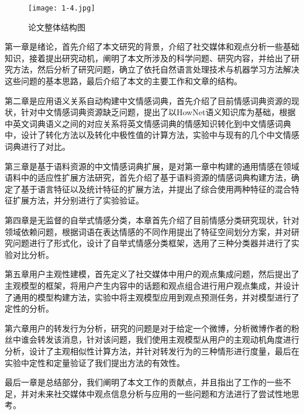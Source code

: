 \begin{figure}[htp]
\centering
\texttt{[image: 1-4.jpg]}
\caption{论文整体结构图}
\label{fig1-4}
\end{figure}

第一章是绪论，首先介绍了本文研究的背景，介绍了社交媒体和观点分析一些基础知识，接着提出研究动机，阐明了本文所涉及的科学问题、研究内容，并给出了研究方法，然后分析了研究问题，确立了依托自然语言处理技术与机器学习方法解决这些问题的基本思路，最后介绍了本文的主要工作和文章的结构。

第二章是应用语义关系自动构建中文情感词典，首先介绍了目前情感词典资源的现状，针对中文情感词典资源缺乏问题，提出了以HowNet语义知识库为基础，根据中英文词典语义之间的对应关系将英文情感词典的情感知识转化到中文情感词典中，设计了转化方法以及转化中极性值的计算方法，实验中与现有的几个中文情感词典进行了对比。

第三章是基于语料资源的中文情感词典扩展，是对第一章中构建的通用情感在领域语料中的适应性扩展方法研究，首先介绍了基于语料资源的情感词典构建方法，确定了基于语言特征以及统计特征的扩展方法，并提出了综合使用两种特征的混合特征扩展方法，并分别进行了实验验证。

第四章是无监督的自举式情感分类，本章首先介绍了目前情感分类研究现状，针对领域依赖问题，根据词语在表达情感的不同作用提出了特征空间划分方案，并对研究问题进行了形式化，设计了自举式情感分类框架，选用了三种分类器并进行了实验对比分析。

第五章用户主观性建模，首先定义了社交媒体中用户的观点集成问题，然后提出了主观模型的框架，将用户产生内容中的话题和观点组合进行用户观点集成，并设计了通用的模型构建方法，实验中将主观模型应用到观点预测任务，并对模型进行了定性的分析。

第六章用户的转发行为分析，研究的问题是对于给定一个微博，分析微博作者的粉丝中谁会转发该消息，针对该问题，我们使用主观模型从用户的主观动机角度进行分析，设计了主观相似性计算方法，并针对转发行为的三种情形进行度量，最后在实验中定性和定量验证了我们提出方法的有效性。

最后一章是总结部分，我们阐明了本文工作的贡献点，并且指出了工作的一些不足，并对未来社交媒体中观点信息分析与应用的一些问题和方法进行了尝试性地思考。


